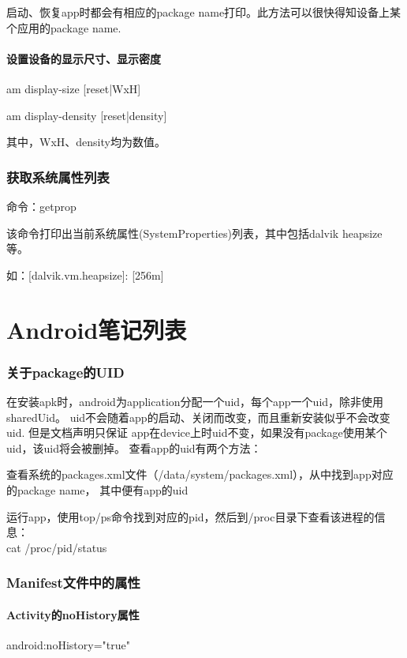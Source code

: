 ﻿\documentclass[a4paper,11pt]{article}
\begin{document}
  启动、恢复app时都会有相应的package name打印。此方法可以很快得知设备上某个应用的package name.

  \subsection[设置设备的显示尺寸、显示密度]{设置设备的显示尺寸、显示密度}
  am display-size [reset|WxH]

  am display-density [reset|density]

  其中，WxH、density均为数值。

  \section[获取系统属性列表]{获取系统属性列表}
  \hspace*{2ex}命令：getprop\par\vspace{2ex}
  该命令打印出当前系统属性(SystemProperties)列表，其中包括dalvik heapsize等。\par
  如：[dalvik.vm.heapsize]: [256m]


  \part[Android Notes List]{Android笔记列表}
  \section[关于package的UID]{关于package的UID}
  在安装apk时，android为application分配一个uid，每个app一个uid，除非使用sharedUid。
	uid不会随着app的启动、关闭而改变，而且重新安装似乎不会改变uid. 但是文档声明只保证
	app在device上时uid不变，如果没有package使用某个uid，该uid将会被删掉。
	查看app的uid有两个方法：
  \begin{coloredenumerate}
    \item 查看系统的packages.xml文件（/data/system/packages.xml），从中找到app对应的package name，
		      其中便有app的uid
    \item 运行app，使用top/ps命令找到对应的pid，然后到/proc目录下查看该进程的信息：\\
      		cat /proc/\lt pid\gt/status
  \end{coloredenumerate}


  \section[Manifest文件中的属性]{Manifest文件中的属性}
  \subsection[Activity的noHistory属性]{Activity的noHistory属性}
  android:noHistory="true"
\end{document}
